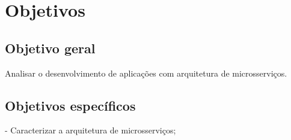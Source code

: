 


\section{Objetivos}\label{sec-objetivos}


\subsection{Objetivo geral}\label{sec-objetivo-geral}

Analisar o desenvolvimento de aplicações com arquitetura de microsserviços.

\subsection{Objetivos específicos}\label{sec-objetivos-especificos}

- Caracterizar a arquitetura de microsserviços;

